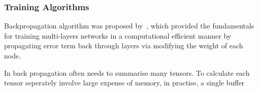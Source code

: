 \subsubsection{Training Algorithms}
Backpropagation algorithm was proposed by~\citet{werbos1975beyond}, which provided the fundamentals for training multi-layers networks in a computational efficient manner by propagating error term back through layers via modifying the weight of each node. 
\par
In back propagation often needs to summarise many tensors. To calculate each tensor seperately involve large expense of memory, in practise, a single buffer